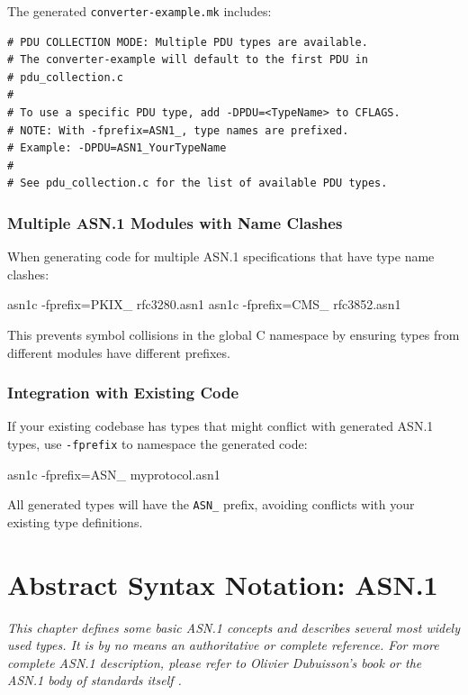 \documentclass[english,oneside,12pt]{book}
\begin{document}
The generated \texttt{converter-example.mk} includes:
\begin{verbatim}
# PDU COLLECTION MODE: Multiple PDU types are available.
# The converter-example will default to the first PDU in 
# pdu_collection.c
#
# To use a specific PDU type, add -DPDU=<TypeName> to CFLAGS.
# NOTE: With -fprefix=ASN1_, type names are prefixed.
# Example: -DPDU=ASN1_YourTypeName
#
# See pdu_collection.c for the list of available PDU types.
\end{verbatim}

\subsection*{Multiple ASN.1 Modules with Name Clashes}

When generating code for multiple ASN.1 specifications that have type name clashes:

\begin{bash}
asn1c -fprefix=PKIX_ rfc3280.asn1
asn1c -fprefix=CMS_ rfc3852.asn1
\end{bash}

This prevents symbol collisions in the global C namespace by ensuring types from 
different modules have different prefixes.

\subsection*{Integration with Existing Code}

If your existing codebase has types that might conflict with generated ASN.1 types, 
use \texttt{-fprefix} to namespace the generated code:

\begin{bash}
asn1c -fprefix=ASN_ myprotocol.asn1
\end{bash}

All generated types will have the \texttt{ASN\_} prefix, avoiding conflicts with your 
existing type definitions.

\chapter{\label{chap:Abstract-Syntax-Notation}Abstract Syntax Notation: ASN.1}

\emph{This chapter defines some basic ASN.1 concepts and describes
several most widely used types. It is by no means an authoritative
or complete reference. For more complete ASN.1 description, please
refer to Olivier Dubuisson's book \cite{Dub00} or the ASN.1 body
of standards itself \cite{ITU-T/ASN.1}.}
\end{document}

